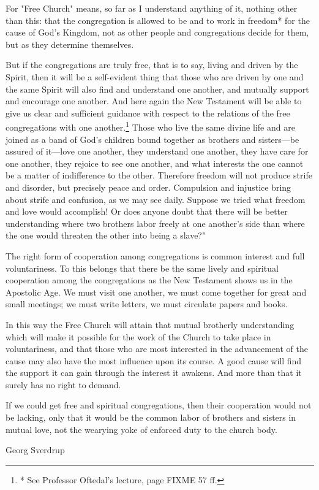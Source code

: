For "Free Church" means, so far as I understand anything of it, nothing other than this: that the congregation is allowed to be and to work in freedom* for the cause of God’s Kingdom, not as other people and congregations decide for them, but as they determine themselves.

But if the congregations are truly free, that is to say, living and driven by the Spirit, then it will be a self-evident thing that those who are driven by one and the same Spirit will also find and understand one another, and mutually support and encourage one another. And here again the New Testament will be able to give us clear and sufficient guidance with respect to the relations of the free congregations with one another.\footnote{* See Professor Oftedal’s lecture, page FIXME 57 ff.} Those who live the same divine life and are joined as a band of God’s children bound together as brothers and sisters---be assured of it---love one another, they understand one another, they have care for one another, they rejoice to see one another, and what interests the one cannot be a matter of indifference to the other. Therefore freedom will not produce strife and disorder, but precisely peace and order. Compulsion and injustice bring about strife and confusion, as we may see daily. Suppose we tried what freedom and love would accomplish! Or does anyone doubt that there will be better understanding where two brothers labor freely at one another’s side than where the one would threaten the other into being a slave?"

The right form of cooperation among congregations is common interest and full voluntariness. To this belongs that there be the same lively and spiritual cooperation among the congregations as the New Testament shows us in the Apostolic Age. We must visit one another, we must come together for great and small meetings; we must write letters, we must circulate papers and books.

In this way the Free Church will attain that mutual brotherly understanding which will make it possible for the work of the Church to take place in voluntariness, and that those who are most interested in the advancement of the cause may also have the most influence upon its course. A good cause will find the support it can gain through the interest it awakens. And more than that it surely has no right to demand.

If we could get free and spiritual congregations, then their cooperation would not be lacking, only that it would be the common labor of brothers and sisters in mutual love, not the wearying yoke of enforced duty to the church body.

Georg Sverdrup
